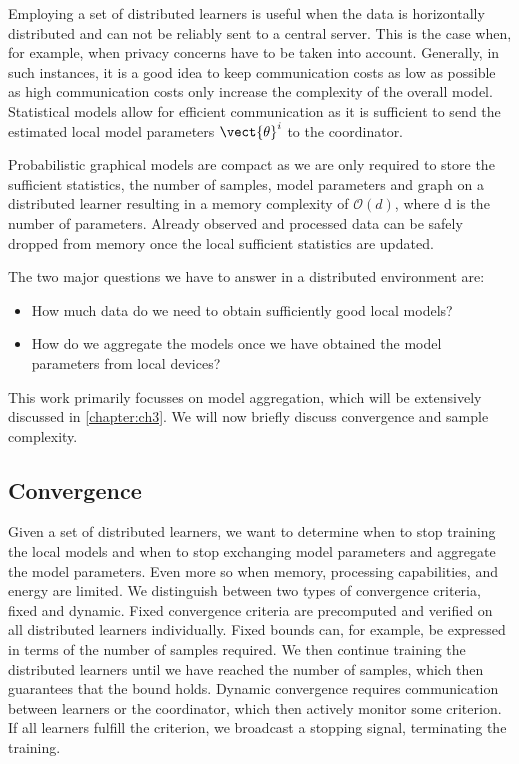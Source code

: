 Employing a set of distributed learners is useful when the data is horizontally distributed and can not be reliably sent to a central server.
This is the case when, for example, when privacy concerns have to be taken into account.
Generally, in such instances, it is a good idea to keep communication costs as low as possible as high communication costs only increase the complexity of the overall model.
Statistical models allow for efficient communication as it is sufficient to send the estimated local model parameters $\vect{\theta}^i$ to the coordinator. 

Probabilistic graphical models are compact as we are only required to store the sufficient statistics, the number of samples, model parameters and graph on a distributed learner resulting in a memory complexity of $\mathcal{O}(d)$, where d is the number of parameters. 
Already observed and processed data can be safely dropped from memory once the local sufficient statistics are updated.

The two major questions we have to answer in a distributed environment are:
\begin{itemize}
    \item How much data do we need to obtain sufficiently good local models?
    \item How do we aggregate the models once we have obtained the model parameters from local devices?
\end{itemize}

This work primarily focusses on model aggregation, which will be extensively discussed in \autoref{chapter:ch3}. 
We will now briefly discuss convergence and sample complexity.

\subsection{Convergence}
Given a set of distributed learners, we want to determine when to stop training the local models and when to stop exchanging model parameters and aggregate the model parameters.
Even more so when memory, processing capabilities, and energy are limited.
We distinguish between two types of convergence criteria, fixed and dynamic.
Fixed convergence criteria are precomputed and verified on all distributed learners individually.
Fixed bounds can, for example, be expressed in terms of the number of samples required. 
We then continue training the distributed learners until we have reached the number of samples, which then guarantees that the bound holds.
Dynamic convergence requires communication between learners or the coordinator, which then actively monitor some criterion.
If all learners fulfill the criterion, we broadcast a stopping signal, terminating the training.

